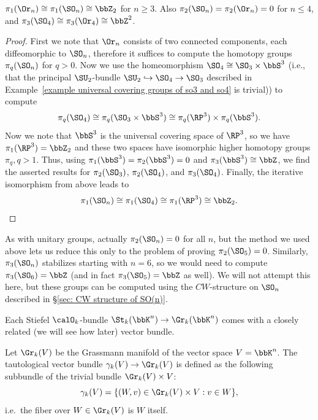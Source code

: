 \begin{cor}
    $\pi_1(\Or_n)\cong \pi_1(\SO_n)\cong\bbZ_2$ for $n\geq 3$. Also $\pi_2(\SO_n)=\pi_2(\Or_n)=0$ for $n\leq 4$, and $\pi_3(\SO_4)\cong\pi_3(\Or_4)\cong\bbZ^2$.
\end{cor}
\begin{proof}
    First we note that $\Or_n$ consists of two connected components, each diffeomorphic to $\SO_n$, therefore it suffices to compute the homotopy groups $\pi_q(\SO_n)$ for $q>0$. Now we use the homeomorphism $\SO_4\cong\SO_3\times \bbS^3$ (i.e., that the principal $\SU_2$-bundle $\SU_2\hookrightarrow \SO_4\to \SO_3$ described in Example~\ref{example universal covering groups of so3 and so4} is trivial)) to compute
    \[\pi_q(\SO_4)\cong \pi_q(\SO_3\times \bbS^3)\cong \pi_q(\RP^3)\times \pi_q(\bbS^3).\]
    Now we note that $\bbS^3$ is the universal covering space of $\RP^3$, so we have $\pi_1(\RP^3)=\bbZ_2$ and these two spaces have isomorphic higher homotopy groups $\pi_q, q>1$. Thus, using $\pi_1(\bbS^3)=\pi_2(\bbS^3)=0$ and $\pi_3(\bbS^3)\cong \bbZ$, we find the asserted results for $\pi_2(\SO_3)$, $\pi_2(\SO_4)$, and $\pi_3(\SO_4)$. Finally, the iterative isomorphism from above leads to
    \[
        \pi_1(\SO_n)\cong \pi_1(\SO_4)\cong \pi_1(\RP^3)\cong \bbZ_2.
    \]
\end{proof}
\begin{rem}
    As with unitary groups, actually $\pi_2(\SO_n)=0$ for all $n$, but the method we used above lets us reduce this only to the problem of proving $\pi_2(\SO_5)=0$. Similarly, $\pi_3(\SO_n)$ stabilizes starting with $n=6$, so we would need to compute $\pi_3(\SO_6)=\bbZ$ (and in fact $\pi_3(\SO_5)=\bbZ$ as well). We will not attempt this here, but these groups can be computed using the $CW$-structure on $\SO_n$ described in \S\ref{sec: CW structure of SO(n)}.
\end{rem}


Each Stiefel $\calO_k$-bundle $\St_k(\bbK^n)\to \Gr_k(\bbK^n)$ comes with a closely related (we will see how later) vector bundle.

\begin{defn}\label{def tautological bundles}
    Let $\Gr_k(V)$ be the Grassmann manifold of the vector space $V=\bbK^n$. The tautological vector bundle $\gamma_k(V)\to \Gr_k(V)$ is defined as the following subbundle of the trivial bundle $\Gr_k(V)\times V$:
    \[\gamma_k(V)=\{(W,v)\in \Gr_k(V)\times V: v\in W\},\]
    i.e.~the fiber over $W\in \Gr_k(V)$ is $W$ itself.
\end{defn}

